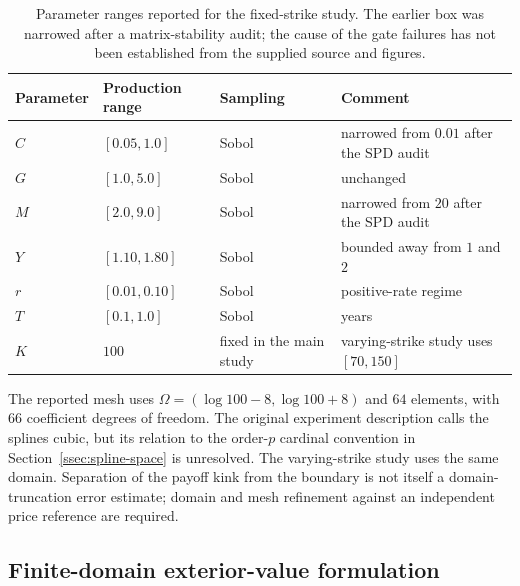 \documentclass[11pt]{amsart}
\theoremstyle{remark}
\newcommand{\rf}{r}
\begin{document}
\begin{table}[ht]
\centering
\caption{Parameter ranges reported for the fixed-strike study. The earlier box was
narrowed after a matrix-stability audit; the cause of the gate failures has
not been established from the supplied source and figures.}
\label{tab:proposed-box}
\small
\begin{tabular}{llll}
\toprule
Parameter & Production range & Sampling & Comment\\
\midrule
$C$    & $[0.05,1.0]$ & Sobol & narrowed from $0.01$ after the SPD audit\\
$G$    & $[1.0,5.0]$  & Sobol & unchanged\\
$M$    & $[2.0,9.0]$  & Sobol & narrowed from $20$ after the SPD audit\\
$Y$    & $[1.10,1.80]$& Sobol & bounded away from $1$ and $2$\\
$\rf$  & $[0.01,0.10]$& Sobol & positive-rate regime\\
$T$    & $[0.1,1.0]$  & Sobol & years\\
$K$    & $100$ & fixed in the main study & varying-strike study uses $[70,150]$\\
\bottomrule
\end{tabular}
\end{table}

The reported mesh uses $\Omega=(\log 100-8,\log 100+8)$ and $64$ elements,
with $66$ coefficient degrees of freedom. The original experiment description
calls the splines cubic, but its relation to the order-$p$ cardinal convention
in Section~\ref{ssec:spline-space} is unresolved. The varying-strike study
uses the same domain. Separation of the payoff kink from the boundary is
not itself a domain-truncation error estimate; domain and mesh refinement
against an independent price reference are required.

\subsection{Finite-domain exterior-value formulation}
\label{ssec:finite-domain}
\end{document}
